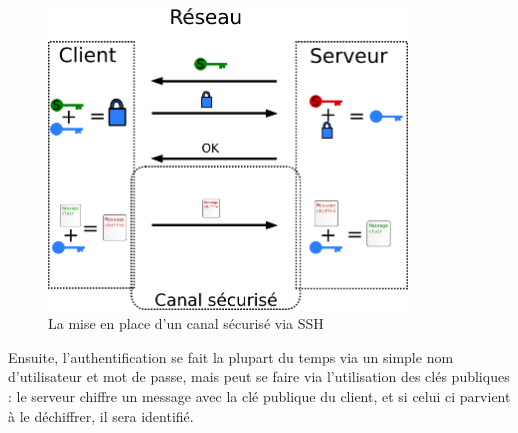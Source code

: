  
\begin{figure}[h]
  \centering
    \label{fig:CanalSecuriseSSH}\includegraphics[width=0.85\textwidth]{images/SSH.png}
    \caption{La mise en place d'un canal sécurisé via SSH}
\end{figure}

Ensuite, l'authentification se fait la plupart du temps via un
simple nom d'utilisateur et mot de passe, mais peut se faire via
l'utilisation des clés publiques : le serveur chiffre un message 
avec la clé
publique du client, et si celui ci parvient à le déchiffrer, il
sera identifié.
